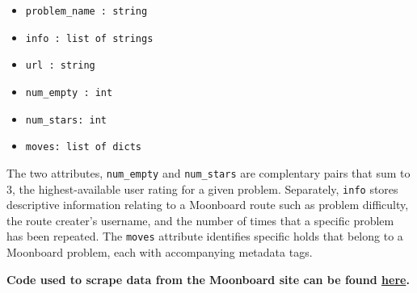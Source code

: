 \documentclass{article}
\begin{document}
\begin{itemize}
\setlength\itemsep{0.1em}
\item \texttt{problem\_name : string}
\item \texttt{info : list of strings}
\item \texttt{url : string}
\item \texttt{num\_empty : int}
\item \texttt{num\_stars: int}
\item \texttt{moves: list of dicts}
\end{itemize}

The two attributes, \texttt{num\_empty} and \texttt{num\_stars} are complentary pairs that sum to 3, the highest-available user rating for a given problem. Separately, \texttt{info} stores descriptive information relating to a Moonboard route such as problem difficulty, the route creater's username, and the number of times that a specific problem has been repeated. The \texttt{moves} attribute identifies specific holds that belong to a Moonboard problem, each with accompanying metadata tags.

{\small\textbf{Code used to scrape data from the Moonboard site can be found \href{https://github.com/gestalt-howard/moonGen/tree/master/howard/scraping}{here}.}}
\end{document}

